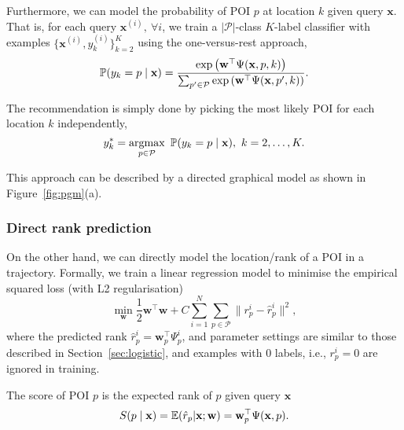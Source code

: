 Furthermore, we can model the probability of POI $p$ at location $k$ given query $\mathbf{x}$.
That is, for each query $\mathbf{x}^{(i)},~ \forall i$, 
we train a $| \mathcal{P} |$-class $K$-label classifier with examples $\{ \mathbf{x}^{(i)}, y_k^{(i)} \}_{k=2}^K$
using the one-versus-rest approach,
\begin{equation*}
\mathbb{P}(y_k = p \mid \mathbf{x}) = \frac{\exp \left( \mathbf{w}^\top \Psi(\mathbf{x}, p, k) \right)}
                                           {\sum_{p' \in \mathcal{P}} \exp \left( \mathbf{w}^\top \Psi(\mathbf{x}, p', k) \right)}.
\end{equation*}

The recommendation is simply done by picking the most likely POI for each location $k$ independently,
\begin{equation*}
y_k^* = \operatorname*{argmax}_{p \in \mathcal{P}}~ \mathbb{P}(y_k = p \mid \mathbf{x}),~ k = 2, \dots, K.
\end{equation*}

This approach can be described by a directed graphical model as shown in Figure~\ref{fig:pgm}(a).



\subsubsection{Direct rank prediction}
\label{sec:linear}

On the other hand, we can directly model the location/rank of a POI in a trajectory.
Formally, we train a linear regression model to minimise the empirical squared loss (with L2 regularisation)
\begin{equation*}
\min_{\mathbf{w}} \frac{1}{2} \mathbf{w}^\top \mathbf{w} + C \sum_{i=1}^N \sum_{p \in \mathcal{P}} \|r_p^i - \hat{r}_p^i \|^2, 
\end{equation*}
where the predicted rank $\hat{r}_p^i = \mathbf{w}_p^\top \Psi_p^i$, 
and parameter settings are similar to those described in Section~\ref{sec:logistic},
and examples with $0$ labels, i.e., $r_p^i = 0$ are ignored in training.

The score of POI $p$ is the expected rank of $p$ given query $\mathbf{x}$ 
\begin{equation*}
S(p \mid \mathbf{x})
= \mathbb{E}(\hat{r}_p | \mathbf{x}; \mathbf{w}) 
= \mathbf{w}_p^\top \Psi(\mathbf{x}, p).
\end{equation*}


